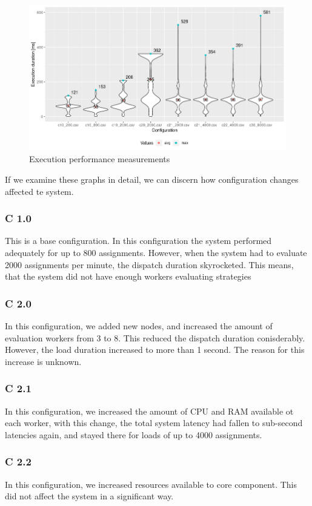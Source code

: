 \begin{figure}[H]
    \includegraphics[width=\textwidth]{obrazky-figures/exec.png}
    \caption{Execution performance measurements}
    \label{img:measure_exec}
\end{figure}


If we examine these graphs in detail, we can discern how configuration changes affected te system.

\subsubsection{C 1.0}
This is a base configuration. In this configuration the system performed adequately for up to 800 assignments.
However, when the system had to evaluate 2000 assignments per minute, the dispatch duration skyrocketed.
This means, that the system did not have enough workers evaluating strategies
\subsubsection{C 2.0}
In this configuration, we added new nodes, and increased the amount of evaluation workers from 3 to 8. This reduced
the dispatch duration conisderably. However, the load duration increased to more than 1 second. The reason for this
increase is unknown.
\subsubsection{C 2.1}
In this configuration, we increased the amount of CPU and RAM available ot each worker, with this change, the
total system latency had fallen to sub-second latencies again, and stayed there for loads of up to 4000 assignments.
\subsubsection{C 2.2}
In this configuration, we increased resources available to core component. This did not affect the system in a significant way.
